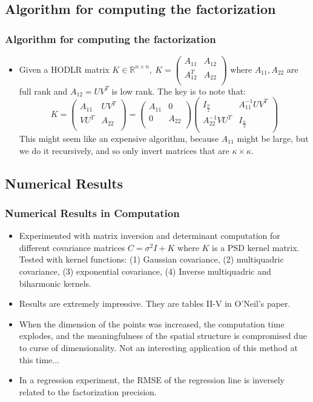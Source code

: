 \documentclass{beamer}
\begin{document}
\subsection{Algorithm for computing the factorization}
\begin{frame}
\frametitle{Algorithm for computing the factorization}
\begin{itemize}
\item Given a HODLR matrix $K\in \mathbb{R}^{n\times n}, \ K = \begin{pmatrix} A_{11} & A_{12} \\ A_{12}^T & A_{22}\\ \end{pmatrix}$ where $A_{11},A_{22}$ are full rank and $A_{12}=UV^T$ is low rank. The key is to note that:
$$K = \begin{pmatrix} A_{11} & UV^T \\ VU^T & A_22\\ \end{pmatrix} = \begin{pmatrix} A_{11} & 0 \\ 0 & A_{22}\\ \end{pmatrix}\begin{pmatrix} I_\frac{n}{2} & A_{11}^{-1}UV^T \\ A_{22}^{-1}VU^T & I_\frac{n}{2} \\ \end{pmatrix}$$
This might seem like an expensive algorithm, because $A_{11}$ might be large, but we do it recursively, and so only invert matrices that are $\kappa\times\kappa$.
\end{itemize}
\end{frame}
\subsection{Numerical Results}
\begin{frame}
\frametitle{Numerical Results in Computation}
\begin{itemize}
\item Experimented with matrix inversion and determinant computation for different covariance matrices $C=\sigma^2 I+K$ where $K$ is a PSD kernel matrix. Tested with kernel functions: (1) Gaussian covariance, (2) multiquadric covariance, (3) exponential covariance, (4) Inverse multiquadric and biharmonic kernels.
\item   Results are extremely impressive. They are tables II-V in O'Neil's paper.
\item When the dimension of the points was increased, the computation time explodes, and the meaningfulness of the spatial structure is compromised due to curse of dimensionality. Not an interesting application of this method at this time...
\item In a regression experiment, the RMSE of the regression line is inversely related to the factorization precision.
\end{itemize}
\end{frame}
\end{document}
